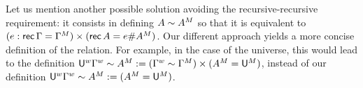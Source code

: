 Let us mention another possible solution avoiding the recursive-recursive
requirement: it consists in defining $A\sim{A}^M$ so that it is equivalent to
$(e:\mathsf{rec}\,\Gamma = {\Gamma}^M)\times (\mathsf{rec}\,A = e\#{A}^M)$.
Our different approach
yields a more concise definition of the relation.
For example, in the case of the universe, this would lead
to the definition
  $  {\mathsf{U}}^w{\Gamma}^w \sim {A}^M := ({\Gamma}^w\sim{\Gamma}^M) \times ({A}^M = {\mathsf{U}}^M)$,
  instead of
  our definition
  $  {\mathsf{U}}^w{\Gamma}^w \sim {A}^M := ({A}^M = {\mathsf{U}}^M)$.



